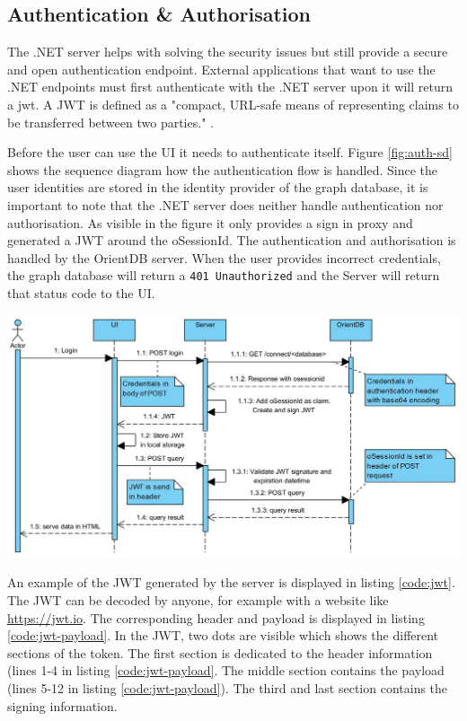 \subsection{Authentication \& Authorisation}
The .NET server helps with solving the security issues but still provide a secure and open authentication endpoint. External applications that want to use the .NET endpoints must first authenticate with the .NET server upon it will return a \acrfull{jwt}. A JWT is defined as a "compact, URL-safe means of representing claims to be transferred between two parties." \cite{jones2015json}.

Before the user can use the UI it needs to authenticate itself. Figure \ref{fig:auth-sd} shows the sequence diagram how the authentication flow is handled. Since the user identities are stored in the identity provider of the graph database, it is important to note that the .NET server does neither handle authentication nor authorisation. As visible in the figure it only provides a sign in proxy and generated a JWT around the oSessionId. The authentication and authorisation is handled by the OrientDB server. When the user provides incorrect credentials, the graph database will return a \verb|401 Unauthorized| and the Server will return that status code to the UI.

\begingroup
\captionsetup{type=figure}
\includegraphics[scale=0.4]{thesis/images/authentication-sd.png}
\label{fig:auth-sd}
\endgroup

An example of the JWT generated by the server is displayed in listing \ref{code:jwt}. The JWT can be decoded by anyone, for example with a website like \url{https://jwt.io}. The corresponding header and payload is displayed in listing \ref{code:jwt-payload}. In the JWT, two dots are visible which shows the different sections of the token. The first section is dedicated to the header information (lines 1-4 in listing \ref{code:jwt-payload}. The middle section contains the payload (lines 5-12 in listing \ref{code:jwt-payload}). The third and last section contains the signing information. 

